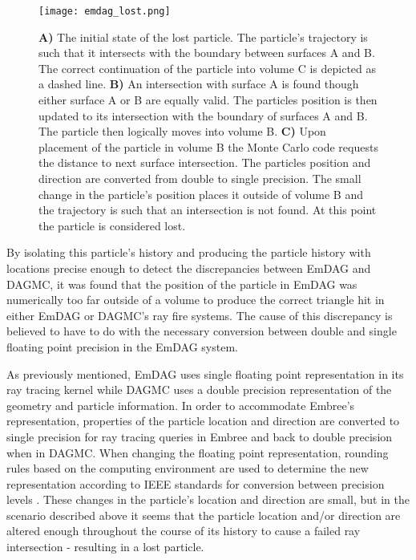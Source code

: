 \begin{figure}[h!]
  \begin{centering}
    \texttt{[image: emdag\_lost.png]}
    \caption[Graphic representation of lost particles.]{\textbf{A)} The initial
      state of the lost particle. The particle's trajectory is such that it
      intersects with the boundary between surfaces A and B. The correct
      continuation of the particle into volume C is depicted as a dashed
      line. \textbf{B)} An intersection with surface A is found though either
      surface A or B are equally valid. The particles position is then updated
      to its intersection with the boundary of surfaces A and B. The particle
      then logically moves into volume B. \textbf{C)} Upon placement of the
      particle in volume B the Monte Carlo code requests the distance to next
      surface intersection. The particles position and direction are converted
      from double to single precision. The small change in the particle's
      position places it outside of volume B and the trajectory is such that an
      intersection is not found. At this point the particle is considered lost.}
    \label{emdag-lost-particles}
  \end{centering}
  \end{figure}

By isolating this particle's history and producing the particle history with
locations precise enough to detect the discrepancies between EmDAG and DAGMC, it
was found that the position of the particle in EmDAG was numerically too far
outside of a volume to produce the correct triangle hit in either EmDAG or
DAGMC's ray fire systems. The cause of this discrepancy is believed to have to
do with the necessary conversion between double and single floating point
precision in the EmDAG system.

As previously mentioned, EmDAG uses single floating point representation in its ray
tracing kernel while DAGMC uses a double precision representation of the
geometry and particle information. In order to accommodate Embree's
representation, properties of the particle location and direction are converted
to single precision for ray tracing queries in Embree and back to double
precision when in DAGMC. When changing the floating point representation,
rounding rules based on the computing environment are used to determine the new
representation according to IEEE standards for conversion between precision
levels \cite{IEEE_STD_2008}. These changes in the particle's location and
direction are small, but in the scenario described above it seems that the
particle location and/or direction are altered enough throughout the course of
its history to cause a failed ray intersection - resulting in a lost particle.

